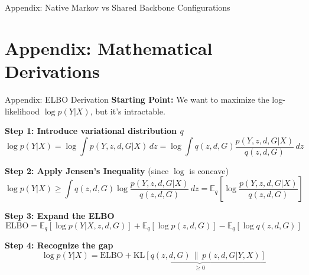 \documentclass[aspectratio=169]{beamer}
\begin{document}
\begin{frame}{Appendix: Native Markov vs Shared Backbone Configurations}
\vspace{0.2cm}
\begin{center}
\end{center}
\end{frame}

\section*{Appendix: Mathematical Derivations}

\begin{frame}{Appendix: ELBO Derivation}
\textbf{Starting Point:} We want to maximize the log-likelihood $\log p(Y|X)$, but it's intractable.

\vspace{0.2cm}
\textbf{Step 1: Introduce variational distribution $q$}
\begin{equation*}
\log p(Y|X) = \log \int p(Y, z, d, G | X) \, dz = \log \int q(z,d,G) \frac{p(Y, z, d, G | X)}{q(z,d,G)} \, dz
\end{equation*}

\textbf{Step 2: Apply Jensen's Inequality} (since $\log$ is concave)
\begin{equation*}
\log p(Y|X) \geq \int q(z,d,G) \log \frac{p(Y, z, d, G | X)}{q(z,d,G)} \, dz = \mathbb{E}_q\left[\log \frac{p(Y, z, d, G | X)}{q(z,d,G)}\right]
\end{equation*}

\textbf{Step 3: Expand the ELBO}
\begin{equation*}
\text{ELBO} = \mathbb{E}_q[\log p(Y|X,z,d,G)] + \mathbb{E}_q[\log p(z,d,G)] - \mathbb{E}_q[\log q(z,d,G)]
\end{equation*}

\textbf{Step 4: Recognize the gap}
\begin{equation*}
\log p(Y|X) = \text{ELBO} + \underbrace{\text{KL}[q(z,d,G) \,\|\, p(z,d,G|Y,X)]}_{\geq 0}
\end{equation*}
\end{frame}
\end{document}
